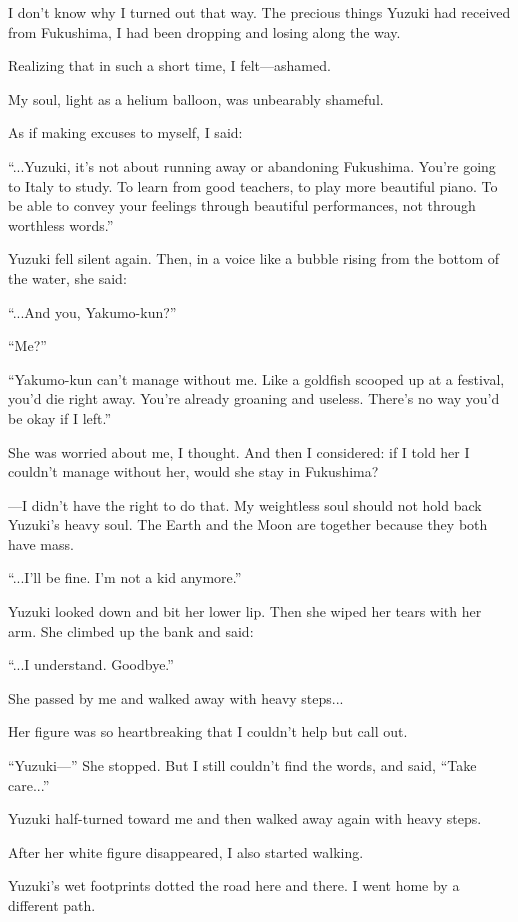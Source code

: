 \documentclass[
    a4paper,
    12pt,
    twoside,
    openany,
    UTF8,
    fontset=windows
]{ctexbook}
\begin{document}
I don't know why I turned out that way. The precious things Yuzuki had received from Fukushima, I had been dropping and losing along the way.

Realizing that in such a short time, I felt---ashamed.

My soul, light as a helium balloon, was unbearably shameful.

As if making excuses to myself, I said:

``...Yuzuki, it's not about running away or abandoning Fukushima. You're going to Italy to study. To learn from good teachers, to play more beautiful piano. To be able to convey your feelings through beautiful performances, not through worthless words.''

Yuzuki fell silent again. Then, in a voice like a bubble rising from the bottom of the water, she said:

``...And you, Yakumo-kun?''

``Me?''

``Yakumo-kun can't manage without me. Like a goldfish scooped up at a festival, you'd die right away. You're already groaning and useless. There's no way you'd be okay if I left.''

She was worried about me, I thought. And then I considered: if I told her I couldn't manage without her, would she stay in Fukushima?

---I didn't have the right to do that. My weightless soul should not hold back Yuzuki's heavy soul. The Earth and the Moon are together because they both have mass.

``...I'll be fine. I'm not a kid anymore.''

Yuzuki looked down and bit her lower lip. Then she wiped her tears with her arm. She climbed up the bank and said:

``...I understand. Goodbye.''

She passed by me and walked away with heavy steps...

Her figure was so heartbreaking that I couldn't help but call out.

``Yuzuki---'' She stopped. But I still couldn't find the words, and said, ``Take care...''

Yuzuki half-turned toward me and then walked away again with heavy steps.

After her white figure disappeared, I also started walking.

Yuzuki's wet footprints dotted the road here and there. I went home by a different path.
\end{document}
